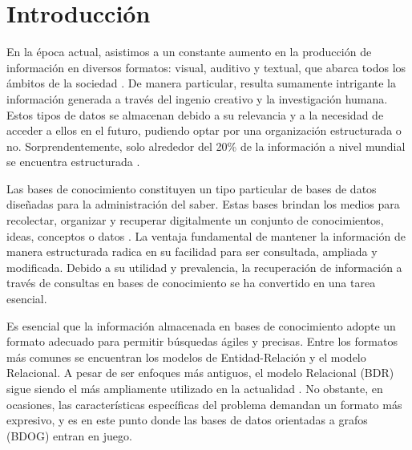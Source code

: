 \chapter*{Introducción}\label{chapter:introduction}

\qquad 

En la época actual, asistimos a un constante aumento en la producción de información en diversos formatos: visual, auditivo y textual, que abarca todos los ámbitos de la sociedad \cite{datagenworld}. De manera particular, resulta sumamente intrigante la información generada a través del ingenio creativo y la investigación humana. Estos tipos de datos se almacenan debido a su relevancia y a la necesidad de acceder a ellos en el futuro, pudiendo optar por una organización estructurada o no. Sorprendentemente, solo alrededor del 20\% de la información a nivel mundial se encuentra estructurada \cite{structdata}.

Las bases de conocimiento constituyen un tipo particular de bases de datos diseñadas para la administración del saber. Estas bases brindan los medios para recolectar, organizar y recuperar digitalmente un conjunto de conocimientos, ideas, conceptos o datos \cite{orgkb}. La ventaja fundamental de mantener la información de manera estructurada radica en su facilidad para ser consultada, ampliada y modificada. Debido a su utilidad y prevalencia, la recuperación de información a través de consultas en bases de conocimiento se ha convertido en una tarea esencial.

Es esencial que la información almacenada en bases de conocimiento adopte un formato adecuado para permitir búsquedas ágiles y precisas. Entre los formatos más comunes se encuentran los modelos de Entidad-Relación y el modelo Relacional. A pesar de ser enfoques más antiguos, el modelo Relacional (BDR) sigue siendo el más ampliamente utilizado en la actualidad \cite{datamodel}. No obstante, en ocasiones, las características específicas del problema demandan un formato más expresivo, y es en este punto donde las bases de datos orientadas a grafos (BDOG) \cite{graphdbs} entran en juego.

